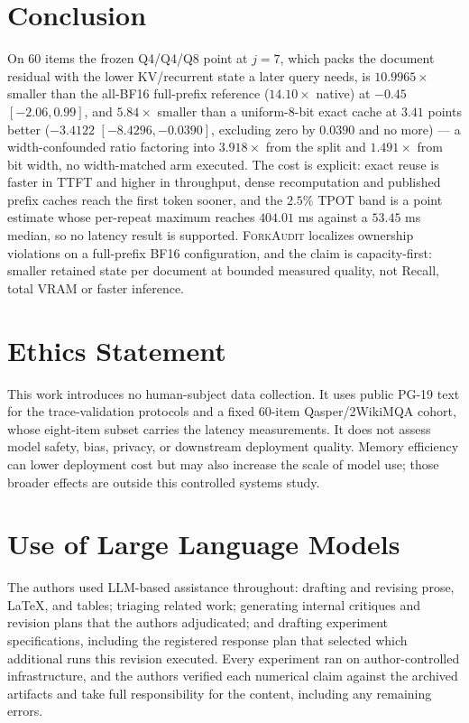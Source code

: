 \documentclass{article}
\newcommand{\method}{\textsc{ForkAudit}}
\begin{document}
\FloatBarrier

\section{Conclusion}

On 60 items the frozen Q4/Q4/Q8 point at $j=7$, which packs the document residual
with the lower KV/recurrent state a later query needs, is $10.9965\times$ smaller
than the all-BF16 full-prefix reference ($14.10\times$ native) at $-0.45$
$[-2.06,0.99]$, and $5.84\times$ smaller than a uniform-8-bit exact cache at
$3.41$ points better ($-3.4122$ $[-8.4296,-0.0390]$, excluding zero by $0.0390$
and no more) --- a width-confounded ratio factoring into $3.918\times$ from the
split and $1.491\times$ from bit width, no width-matched arm executed.  The cost
is explicit: exact reuse is faster in TTFT and higher in throughput, dense
recomputation and published prefix caches reach the first token sooner, and the
$2.5\%$ TPOT band is a point estimate whose per-repeat maximum reaches $404.01$
ms against a $53.45$ ms median, so no latency result is supported.  \method{}
localizes ownership violations on a full-prefix BF16 configuration, and the claim
is capacity-first: smaller retained state per document at bounded measured
quality, not Recall, total VRAM or faster inference.

\section*{Ethics Statement}
This work introduces no human-subject data collection. It uses public PG-19 text
for the trace-validation protocols and a fixed 60-item Qasper/2WikiMQA cohort,
whose eight-item subset carries the latency measurements. It does not assess
model safety, bias, privacy, or downstream deployment quality. Memory efficiency
can lower deployment cost but may also increase the scale of model use; those
broader effects are outside this controlled systems study.

\section*{Use of Large Language Models}
The authors used LLM-based assistance throughout: drafting and revising prose,
LaTeX, and tables; triaging related work; generating internal critiques and
revision plans that the authors adjudicated; and drafting experiment
specifications, including the registered response plan that selected which
additional runs this revision executed. Every experiment ran on
author-controlled infrastructure, and the authors verified each numerical claim
against the archived artifacts and take full responsibility for the content,
including any remaining errors.
\end{document}
